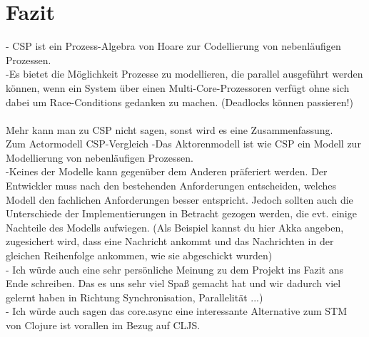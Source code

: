 \chapter{Fazit}

- CSP ist ein Prozess-Algebra von Hoare zur Codellierung von  nebenläufigen Prozessen.\\
-Es bietet die Möglichkeit Prozesse zu modellieren, die parallel ausgeführt werden können, wenn ein System über einen  Multi-Core-Prozessoren verfügt ohne sich dabei um  Race-Conditions gedanken zu machen. (Deadlocks können passieren!)\\\\
	Mehr kann man zu CSP nicht sagen, sonst wird es eine Zusammenfassung.\\
	
Zum Actormodell CSP-Vergleich
-Das Aktorenmodell ist wie CSP ein Modell zur Modellierung von nebenläufigen Prozessen.\\
-Keines der Modelle kann gegenüber dem Anderen präferiert werden. Der Entwickler muss nach den bestehenden Anforderungen entscheiden, welches Modell den fachlichen Anforderungen besser entspricht. Jedoch sollten auch die Unterschiede der Implementierungen in Betracht gezogen werden, die evt. einige Nachteile des Modells aufwiegen.
(Als Beispiel kannst du hier Akka angeben, zugesichert wird, dass eine Nachricht ankommt und das Nachrichten in der gleichen Reihenfolge ankommen, wie sie abgeschickt wurden)\\
- Ich würde auch eine sehr persönliche Meinung zu dem Projekt ins Fazit ans Ende schreiben. Das es uns sehr viel Spaß gemacht hat und wir dadurch viel gelernt haben in Richtung Synchronisation, Parallelität ...)\\
- Ich würde auch sagen das core.async eine interessante Alternative zum STM von Clojure ist vorallen im Bezug auf CLJS.


